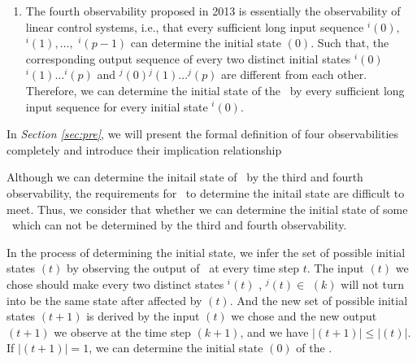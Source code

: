 \begin{enumerate}
	\item  The fourth observability proposed in 2013 \cite{Fornasini2013Observability} is essentially the observability of linear control systems, i.e., that every sufficient long input sequence \Input$^{i}(0),$ \Input$^{i}(1),\ldots,$ \Input$^{i}(p-1)$ can determine the initial state \State$(0)$. Such that, the corresponding output sequence of every two distinct initial states \Output$^{i}(0)$\Output$^{i}(1)\ldots$\Output$^{i}(p)$ and \Output$^{j}(0)$\Output$^{j}(1)\ldots$\Output$^{j}(p)$ are different from each other. Therefore, we can determine the initial state of the \BCN\ by every sufficient long input sequence for every initial state \State$^{i}(0)$.
\end{enumerate}
 


In {\em Section \ref{sec:pre}}, we will present the formal definition of four observabilities completely and introduce their implication relationship%

 Although we can determine the initail state of \BCNs\ by the third and fourth observability, the requirements for \BCNs\ to determine the initail state are difficult to meet. Thus, we consider that whether we can determine the initial state of some \BCNs\ which can not be determined by the third and fourth observability.

In the process of determining the initial state, we infer the set of possible initial states \Ustate$(t)$ by observing the output of \BCN\ at every time step $t$. The input \Input$(t)$ we chose should make every two distinct states \State$^{i}(t)$ , \State$^{j}(t)$$\in$ \Ustate$(k)$ will not turn into be the same state after affected by \Input$(t)$. And the new set of possible initial states \Ustate$(t+1)$ is derived by the input \Input$(t)$ we chose and the new output \Output$(t+1)$ we observe at the time step $(k+1)$, and we have $|$\Ustate$(t+1)$$|\le|$\Ustate$(t)$$|$. If $|$\Ustate$(t+1)$$|=1$, we can determine the initial state \State$(0)$ of the \BCN.

